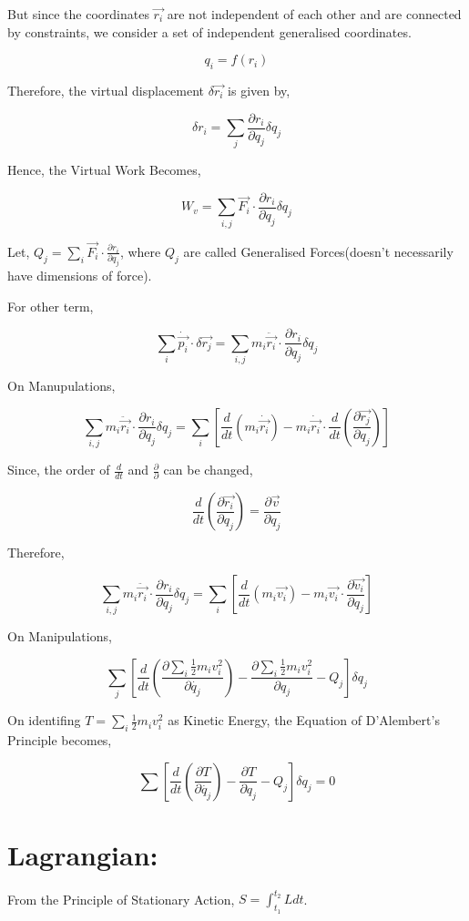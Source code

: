 \documentclass[a4paper]{article}
\newcommand{\ddt}{\frac{d}{dt}}
\newcommand{\pdt}[2]{\frac{\partial #1}{\partial #2}}
\newcommand{\half}{\frac{1}{2}}
\begin{document}
			But since the coordinates $\vec{r_i}$ are not independent of each other and are connected by constraints, we consider a set of independent generalised coordinates.

			$$ q_i = f(r_i) $$

			Therefore, the virtual displacement $\delta \vec{r_i}$ is given by,

			$$ \delta r_i = \sum_j \pdt{r_i}{q_j}\delta q_j $$

			Hence, the Virtual Work Becomes,

			$$ W_v = \sum_{i,j} \vec{F_i} \cdot \pdt{r_i}{q_j}\delta q_j $$

			Let, $Q_j = \sum_i \vec{F_i} \cdot \pdt{r_i}{q_j}$, where $Q_j$ are called Generalised Forces(doesn't necessarily have dimensions of force).

			For other term,

			$$ \sum_i \dot{\vec{p_i}} \cdot \delta \vec{r_j}  = \sum_{i,j} m_i \ddot{\vec{r_i}} \cdot \pdt{r_i}{q_j} \delta q_j $$

			On Manupulations,

			$$ \sum_{i,j} m_i \ddot{\vec{r_i}} \cdot \pdt{r_i}{q_j} \delta q_j = \sum_i[ \ddt (m_i \dot{\vec{r_i}}) - m_i \dot{\vec{r_i}} \cdot \ddt(\pdt{\vec{r_j}}{q_j})] $$
			
			Since, the order of $\ddt$ and $\pdt{}{}$ can be changed,

			$$ \ddt(\pdt{\vec{r_i}}{q_j}) = \pdt{\vec{v}}{q_j} $$

			Therefore,

			$$ \sum_{i,j} m_i \ddot{\vec{r_i}} \cdot \pdt{r_i}{q_j} \delta q_j = \sum_i[ \ddt (m_i \vec{v_i}) - m_i \vec{v_i} \cdot \pdt{\vec{v_i}}{q_j}] $$

			On Manipulations, 

			$$ \sum_j [ \ddt(\pdt{\sum_i \half m_i v_i^2}{\dot{q_j}})  - \pdt{\sum_i \half m_i v_i^2}{q_j} - Q_j]\delta q_j $$

			On identifing $T = \sum_i \half m_i v_i^2$ as Kinetic Energy, the Equation of D'Alembert's Principle becomes,

			\begin{equation}
				\sum[\ddt(\pdt{T}{\dot{q_j}}) - \pdt{T}{q_j} - Q_j]\delta q_j = 0 
			\end{equation}
		
	\section*{Lagrangian: }
		From the Principle of Stationary Action, $S = \int_{t_1}^{t_2} L dt $.
\end{document}
